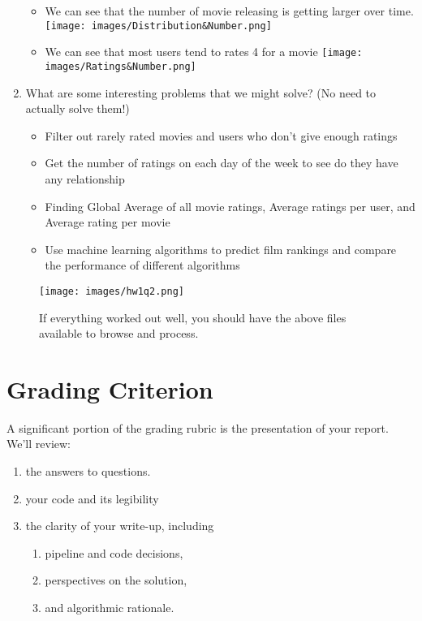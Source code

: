 \documentclass[paper=a4, fontsize=11pt]{scrartcl} %
\begin{document}
\begin{enumerate}
        \begin{itemize}
            \item We can see that the number of movie releasing is getting larger over time.\newline 
            \texttt{[image: images/Distribution\&Number.png]}
            \item We can see that most users tend to rates 4 for a movie\newline
            \texttt{[image: images/Ratings\&Number.png]}
        \end{itemize}
    \item What are some interesting problems that we might solve? (No need to actually solve them!)
        \begin{itemize}
            \item Filter out rarely rated movies and users who don't give enough ratings
            \item Get the number of ratings on each day of the week to see do they have any relationship
            \item Finding Global Average of all movie ratings, Average ratings per user, and Average rating per movie
            \item Use machine learning algorithms to predict film rankings and compare the performance of different algorithms
        \end{itemize}
\end{enumerate}

\begin{figure}
    \centering
    \texttt{[image: images/hw1q2.png]}
    \caption{If everything worked out well, you should have the above files available to browse and process.}
    \label{fig:data-files}
\end{figure}

\section{Grading Criterion}

A significant portion of the grading rubric is the presentation of your report. We'll review:

\begin{enumerate}
    \item the answers to questions.
    \item your code and its legibility
    \item the clarity of your write-up, including 
    \begin{enumerate}
      \item pipeline and code decisions, 
      \item perspectives on the solution, 
      \item and algorithmic rationale.
    \end{enumerate}
\end{enumerate}
\end{document}
